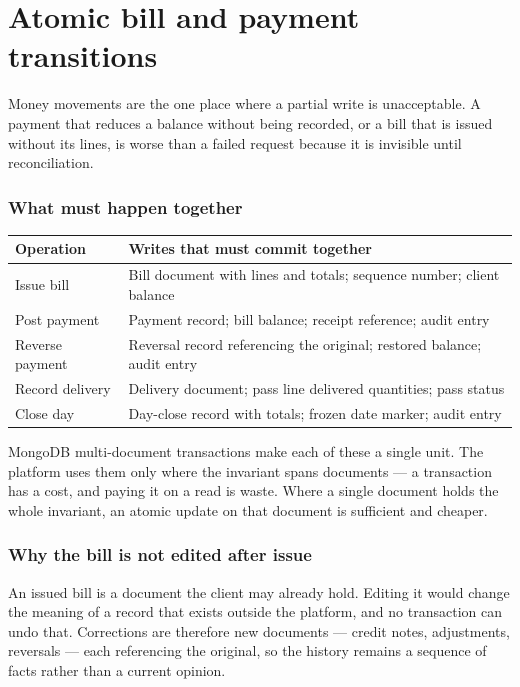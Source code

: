 \documentclass[11pt,a4paper,oneside]{book}
\begin{document}
\section*{Atomic bill and payment transitions}
Money movements are the one place where a partial write is unacceptable. A payment that reduces a balance without being recorded, or a bill that is issued without its lines, is worse than a failed request because it is invisible until reconciliation.

\subsubsection*{What must happen together}
\begin{center}\small
\begin{tabularx}{\linewidth}{|X|X|}
\hline
\rowcolor{lightgrey}
\textbf{Operation} & \textbf{Writes that must commit together} \\ \hline
Issue bill & Bill document with lines and totals; sequence number; client balance \\ \hline
Post payment & Payment record; bill balance; receipt reference; audit entry \\ \hline
Reverse payment & Reversal record referencing the original; restored balance; audit entry \\ \hline
Record delivery & Delivery document; pass line delivered quantities; pass status \\ \hline
Close day & Day-close record with totals; frozen date marker; audit entry \\ \hline
\end{tabularx}
\end{center}
MongoDB multi-document transactions make each of these a single unit. The platform uses them only where the invariant spans documents — a transaction has a cost, and paying it on a read is waste. Where a single document holds the whole invariant, an atomic update on that document is sufficient and cheaper.

\subsubsection*{Why the bill is not edited after issue}
An issued bill is a document the client may already hold. Editing it would change the meaning of a record that exists outside the platform, and no transaction can undo that. Corrections are therefore new documents — credit notes, adjustments, reversals — each referencing the original, so the history remains a sequence of facts rather than a current opinion.
\end{document}
